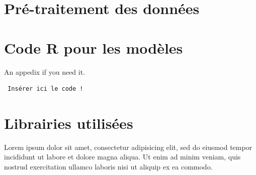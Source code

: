 \documentclass[a4paper, oneside, 12pt, final]{extreport}
\begin{document}
\section{Pré-traitement des données}
\section{Code R pour les modèles}

An appedix if you need it.

\begin{verbatim}
 Insérer ici le code !
 \end{verbatim}

\section{Librairies utilisées}

Lorem ipsum dolor sit amet, consectetur adipisicing elit, sed do eiusmod
tempor incididunt ut labore et dolore magna aliqua. Ut enim ad minim veniam,
quis nostrud exercitation ullamco laboris nisi ut aliquip ex ea commodo.


\nocite{*}







%



\cleardoublepage%


\printglossaries
\printindex


\end{document}
